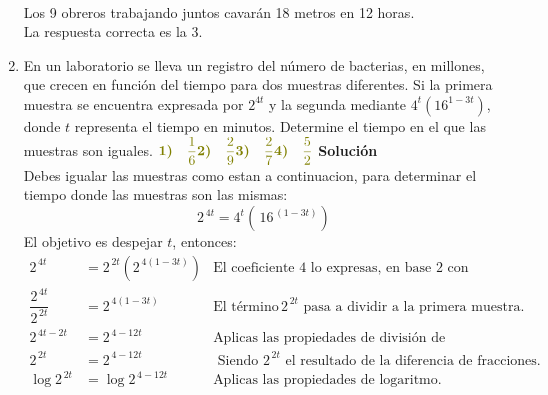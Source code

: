 \documentclass[11pt, a4paper]{article} %
\theoremstyle{dotlessP}
\theoremstyle{dotlessS}
\begin{document}
\begin{enumerate}[label=\color{dg}\theenumi.]
\begin{table}[htbp]
\begin{tabular}{cccc}
 		\end{tabular}
	\end{table}
       \\
	Los 9 obreros trabajando juntos cavarán 18 metros en 12 	horas.    \\
	{\color{dh} La respuesta correcta es la 3.}
	\\
\item {\color{db} En un laboratorio se lleva un registro del número de bacterias, en millones, que crecen en función del tiempo para dos muestras diferentes. Si la primera muestra se encuentra expresada por \(2^{4t}\) y  la segunda mediante \(4^t (16^{1 - 3t})\), donde \(t\) representa el tiempo en minutos. Determine el tiempo en el que las muestras son iguales.}
   \(
\vspace{1\baselineskip} \\ 	
     {\color{dh} \textbf{1)} \quad \dfrac{1}{6}} \vspace{1\baselineskip} \\ 	
     {\color{dh} \textbf{2)} \quad \dfrac{2}{9}} \vspace{1\baselineskip} \\ 	
     {\color{dh} \textbf{3)} \quad \dfrac{2}{7}} \vspace{1\baselineskip} \\ 	
     {\color{dh} \textbf{4)} \quad \dfrac{5}{2}}   \vspace{1\baselineskip} \\ 	
      \)
      \textbf{Solución} 
    \\ Debes igualar las muestras como estan a continuacion, para determinar el tiempo donde las muestras son las mismas:
\[
2^{\,4t}  = 4^t(\,16^{\,(1 - 3t)})
\]
El objetivo es despejar \(t\), entonces: 
\begin{align*}
2^{\,4t}  &= 2^{\,2t}(2^{\,4(1 - 3t)})   &{\text{El coeficiente 4 lo expresas, en base 2 con exponente 2.}}  
\\
\dfrac{2^{\,4t}}{2^{\,2t}}  &=  2^{\,4(1 - 3t)}  &{\text{El término}\, {2^{\,2t}}  \text{ pasa a dividir a la primera muestra.}} 
\\
2^{\,4t-2t}  &= 2^{\,4 - 12t} &\text{Aplicas las propiedades de división de fracciones.}  
\\
2^{\,2t}  &= 2^{\,4 - 12t} &{\text{ Siendo} \,\, {2^{\,2t}}  \text{ el resultado de la diferencia de fracciones.}} 
\\
\log 2^{\,2t}  &= \log 2^{\,4 - 12t} &\text{Aplicas las propiedades de logaritmo.}  

\end{align*}
\end{enumerate}
\end{document}
